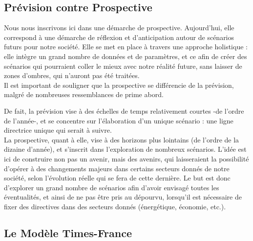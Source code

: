 \documentclass{article}
\theoremstyle{nopointbreak}
\theoremstyle{nobrkbold}
\begin{document}
\subsection{Prévision contre Prospective}

Nous nous inscrivons ici dans une démarche de prospective. Aujourd'hui, elle correspond à une démarche de réflexion et d'anticipation autour de scénarios futurs pour notre société. Elle se met en place à travers une approche holistique : elle intègre un grand nombre de données et de paramètres, et ce afin de créer des scénarios qui pourraient coller le mieux avec notre réalité future, sans laisser de zones d'ombres, qui n'auront pas été traitées. \\

Il est important de souligner que la prospective se différencie de la prévision, malgré de nombreuses ressemblances de prime abord.

De fait, la prévision vise à des échelles de temps relativement courtes -de l'ordre de l'année-, et se concentre sur l'élaboration d'un unique scénario : une ligne directrice unique qui serait à suivre.\\

La prospective, quant à elle, vise à des horizons plus lointains (de l'ordre de la dizaine d'année), et s'inscrit dans l'exploration de nombreux scénarios. L'idée est ici de construire non pas un avenir, mais des avenirs, qui laisseraient la possibilité d'opérer à des changements majeurs dans certains secteurs donnés de notre société, selon l'évolution réelle qui se fera de cette dernière. Le but est donc d'explorer un grand nombre de scénarios afin d'avoir envisagé toutes les éventualités, et ainsi de ne pas être pris au dépourvu, lorsqu'il est nécessaire de fixer des directives dans des secteurs donnés (énergétique, économie, etc.).

\subsection{Le Modèle Times-France}
\end{document}
